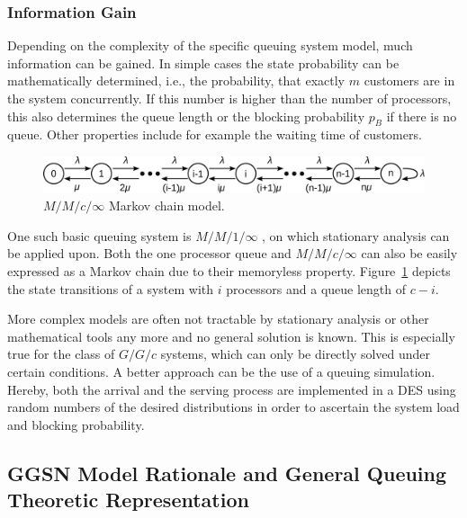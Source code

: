\subsubsection{Information Gain}

Depending on the complexity of the specific queuing system model, much information can be gained. In simple cases the state probability can be mathematically determined, i.e., the probability, that exactly $m$ customers are in the system concurrently. If this number is higher than the number of processors, this also determines the queue length or the blocking probability $p_B$ if there is no queue. Other properties include for example the waiting time of customers.

\begin{figure}[htb]
	\centering
	\includegraphics[width=\textwidth]{images/markovchain.pdf}
	\caption{$M/M/c/\infty$ Markov chain model.}
\label{c4:fig:markovchain}
\end{figure}

One such basic queuing system is $M/M/1/\infty$ \cite[pp.~94-99]{Kleinrock:1975:TVQ:1096491}, on which stationary analysis can be applied upon. Both the one processor queue and $M/M/c/\infty$ can also be easily expressed as a Markov chain due to their memoryless property. Figure~\ref{c4:fig:markovchain} depicts the state transitions of a system with $i$ processors and a queue length of $c-i$.

More complex models are often not tractable by stationary analysis or other mathematical tools any more and no general solution is known. This is especially true for the class of $G/G/c$ systems, which can only be directly solved under certain conditions. A better approach can be the use of a queuing simulation. Hereby, both the arrival and the serving process are implemented in a \gls{DES} using random numbers of the desired distributions in order to ascertain the system load and blocking probability.


\subsection{GGSN Model Rationale and General Queuing Theoretic Representation}

